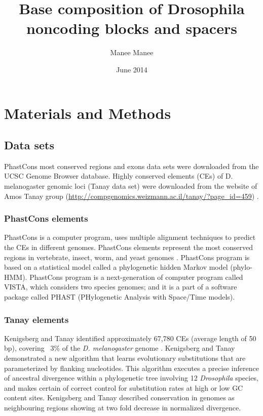 \documentclass[12pt]{report}
\title{Base composition of Drosophila noncoding blocks and spacers}
\author{Manee Manee}
\date{June 2014}
\begin{document}
\pagestyle{plain} %
\maketitle
\onehalfspacing %


\section{Materials and Methods}
\subsection{Data sets}
PhastCons most conserved regions and exons data sets were downloaded from the UCSC Genome Browser database. Highly conserved elements (CEs) of D. melanogaster genomic loci (Tanay data set) were downloaded from the website of Amos Tanay group (\url{http://compgenomics.weizmann.ac.il/tanay/?page_id=459}) \citep{Tanay2013}.

\subsubsection{PhastCons elements}
PhastCons is a computer program, uses multiple alignment techniques to predict the CEs in different genomes. PhastCons elements represent the most conserved regions in vertebrate, insect, worm, and yeast genomes \citep{Siepel2005}. PhastCons program is based on a statistical model called a phylogenetic hidden Markov model (phylo-HMM). PhastCons program is a next-generation of computer program called VISTA, which considers two species genomes; and it is a part of a software package called PHAST (PHylogenetic Analysis with Space/Time models).

\subsubsection{Tanay elements}
Kenigsberg and Tanay identified approximately 67,780 CEs (average length of 50 bp), covering ~3\% of the \textit{D. melanogaster} genome \citep{Tanay2013}. Kenigsberg and Tanay demonstrated a new algorithm that learns evolutionary substitutions that are parameterized by flanking nucleotides. This algorithm executes a precise inference of ancestral divergence within a phylogenetic tree involving 12 \textit{Drosophila} species, and makes certain of correct control for substitution rates at high or low GC content sites. Kenigsberg and Tanay described conservation in genomes as neighbouring regions showing at two fold decrease in normalized divergence. 
\end{document}
